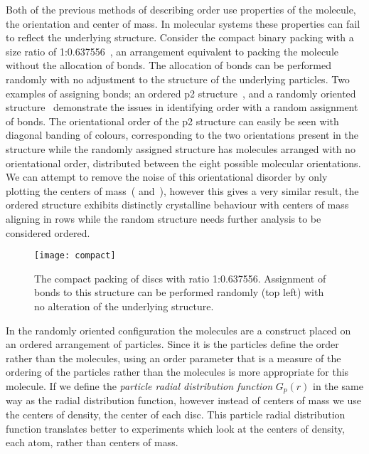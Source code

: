 Both of the previous methods of describing order use properties of the molecule, the orientation and center of mass. In molecular systems these properties can fail to reflect the underlying structure. Consider the compact binary packing with a size ratio of 1:0.637556~, an arrangement equivalent to packing the \dcon molecule without the allocation of bonds. The allocation of bonds can be performed randomly with no adjustment to the structure of the underlying particles. Two examples of assigning bonds; an ordered p2 structure~, and a randomly oriented structure~ demonstrate the issues in identifying order with a random assignment of bonds. The orientational order of the p2 structure can easily be seen with diagonal banding of colours, corresponding to the two orientations present in the structure while the randomly assigned structure has molecules arranged with no orientational order, distributed between the eight possible molecular orientations. We can attempt to remove the noise of this orientational disorder by only plotting the centers of mass~( and~), however this gives a very similar result, the ordered structure exhibits distinctly crystalline behaviour with centers of mass aligning in rows while the random structure needs further analysis to be considered ordered.

\begin{figure}
    \centering
    \texttt{[image: compact]}
    \caption{The compact packing of discs with ratio 1:0.637556. Assignment of bonds to this structure can be performed randomly (top left) with no alteration of the underlying structure.}
    \label{fig:compact}
\end{figure}

In the randomly oriented configuration the molecules are a construct placed on an ordered arrangement of particles. Since it is the particles define the order rather than the molecules, using an order parameter that is a measure of the ordering of the particles rather than the molecules is more appropriate for this molecule. If we define the \emph{particle radial distribution function} $G_p(r)$ in the same way as the radial distribution function, however instead of centers of mass we use the centers of density, the center of each disc. This particle radial distribution function translates better to experiments which look at the centers of density, each atom, rather than centers of mass. 

